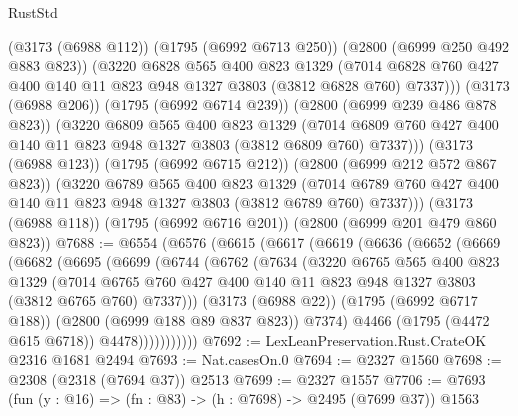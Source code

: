 \begin{lexlean}{RustStd}
\begin{coremodule}
          (@3173 (@6988 @112))
          (@1795 (@6992 @6713 @250))
          (@2800 (@6999 @250 @492 @883 @823))
          (@3220
            @6828
            @565
            @400
            @823
            @1329
            (@7014 @6828 @760 @427 @400 @140 @11 @823 @948 @1327 @3803 (@3812 @6828 @760) @7337)))
        (@3173 (@6988 @206))
        (@1795 (@6992 @6714 @239))
        (@2800 (@6999 @239 @486 @878 @823))
        (@3220
          @6809
          @565
          @400
          @823
          @1329
          (@7014 @6809 @760 @427 @400 @140 @11 @823 @948 @1327 @3803 (@3812 @6809 @760) @7337)))
      (@3173 (@6988 @123))
      (@1795 (@6992 @6715 @212))
      (@2800 (@6999 @212 @572 @867 @823))
      (@3220
        @6789
        @565
        @400
        @823
        @1329
        (@7014 @6789 @760 @427 @400 @140 @11 @823 @948 @1327 @3803 (@3812 @6789 @760) @7337)))
    (@3173 (@6988 @118))
    (@1795 (@6992 @6716 @201))
    (@2800 (@6999 @201 @479 @860 @823))
@7688 := @6554
    (@6576
      (@6615
        (@6617
          (@6619
            (@6636
              (@6652
                (@6669
                  (@6682
                    (@6695
                      (@6699
                        (@6744
                          (@6762
                            (@7634
                              (@3220
                                @6765
                                @565
                                @400
                                @823
                                @1329
                                (@7014
                                  @6765
                                  @760
                                  @427
                                  @400
                                  @140
                                  @11
                                  @823
                                  @948
                                  @1327
                                  @3803
                                  (@3812 @6765 @760)
                                  @7337)))
                            (@3173 (@6988 @22))
                            (@1795 (@6992 @6717 @188))
                            (@2800 (@6999 @188 @89 @837 @823))
                            @7374)
                          @4466
                          (@1795 (@4472 @615 @6718))
                          @4478)))))))))))
@7692 := LexLeanPreservation.Rust.CrateOK @2316 @1681 @2494
@7693 := Nat.casesOn.{0}
@7694 := @2327 @1560
@7698 := @2308 (@2318 (@7694 @37)) @2513
@7699 := @2327 @1557
@7706 := @7693 (fun (y : @16) => (fn : @83) -> (h : @7698) -> @2495 (@7699 @37)) @1563

\end{coremodule}
\end{lexlean}
